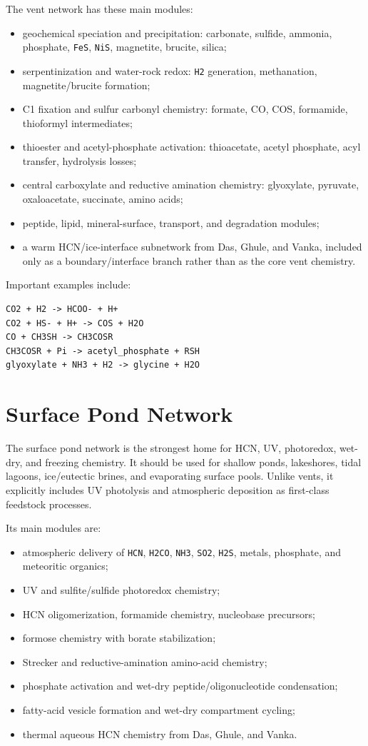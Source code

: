 \documentclass[11pt]{article}
\newcommand{\ch}[1]{\mbox{\texttt{#1}}}
\begin{document}
The vent network has these main modules:
\begin{itemize}
\item geochemical speciation and precipitation: carbonate, sulfide, ammonia,
phosphate, \ch{FeS}, \ch{NiS}, magnetite, brucite, silica;
\item serpentinization and water-rock redox: \ch{H2} generation, methanation,
magnetite/brucite formation;
\item C1 fixation and sulfur carbonyl chemistry: formate, CO, COS,
formamide, thioformyl intermediates;
\item thioester and acetyl-phosphate activation: thioacetate,
acetyl phosphate, acyl transfer, hydrolysis losses;
\item central carboxylate and reductive amination chemistry: glyoxylate,
pyruvate, oxaloacetate, succinate, amino acids;
\item peptide, lipid, mineral-surface, transport, and degradation modules;
\item a warm HCN/ice-interface subnetwork from Das, Ghule, and Vanka, included
only as a boundary/interface branch rather than as the core vent chemistry.
\end{itemize}

Important examples include:
\begin{verbatim}
CO2 + H2 -> HCOO- + H+
CO2 + HS- + H+ -> COS + H2O
CO + CH3SH -> CH3COSR
CH3COSR + Pi -> acetyl_phosphate + RSH
glyoxylate + NH3 + H2 -> glycine + H2O
\end{verbatim}

\section{Surface Pond Network}

The surface pond network is the strongest home for HCN, UV, photoredox,
wet-dry, and freezing chemistry.  It should be used for shallow ponds,
lakeshores, tidal lagoons, ice/eutectic brines, and evaporating surface pools.
Unlike vents, it explicitly includes UV photolysis and atmospheric deposition as
first-class feedstock processes.

Its main modules are:
\begin{itemize}
\item atmospheric delivery of \ch{HCN}, \ch{H2CO}, \ch{NH3}, \ch{SO2},
\ch{H2S}, metals, phosphate, and meteoritic organics;
\item UV and sulfite/sulfide photoredox chemistry;
\item HCN oligomerization, formamide chemistry, nucleobase precursors;
\item formose chemistry with borate stabilization;
\item Strecker and reductive-amination amino-acid chemistry;
\item phosphate activation and wet-dry peptide/oligonucleotide condensation;
\item fatty-acid vesicle formation and wet-dry compartment cycling;
\item thermal aqueous HCN chemistry from Das, Ghule, and Vanka.
\end{itemize}
\end{document}
